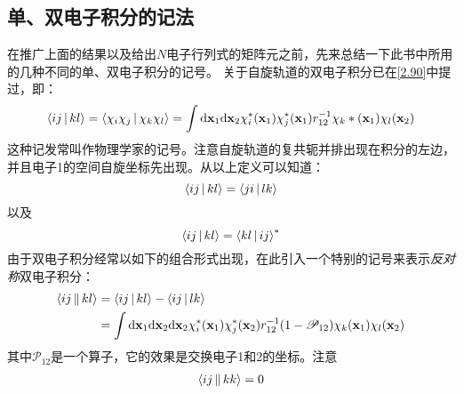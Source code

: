 
\subsection{单、双电子积分的记法}
\label{sec2.3.2}
在推广上面的结果以及给出$N$电子行列式的矩阵元之前，先来总结一下此书中所用的几种不同的单、双电子积分的记号。
关于自旋轨道的双电子积分已在\ref{2.90}中提过，即：
\begin{equation}
\braket{ij|kl}=\braket{\chi_i\chi_j|\chi_k\chi_l}=\int\dd\mathbf{x}_1\dd\mathbf{x}_2\chi_i^*(\mathbf{x}_1)\chi_j^*(\mathbf{x}_1)r_{12}^{-1}\chi_k*(\mathbf{x}_1)\chi_l(\mathbf{x}_2)
\end{equation}
这种记发常叫作物理学家的记号。注意自旋轨道的复共轭并排出现在积分的左边，并且电子1的空间自旋坐标先出现。从以上定义可以知道：
\begin{equation}
\Braket{ij|kl}=\Braket{ji|lk}
\end{equation}
以及
\begin{equation}
\Braket{ij|kl}=\Braket{kl|ij}^*
\end{equation}
由于双电子积分经常以如下的组合形式出现，在此引入一个特别的记号来表示\emph{反对称}双电子积分：
\begin{align}
\braket{ij||kl}&=\braket{ij|kl} - \braket{ij|lk}\notag\\
&=\int\dd\bo{x}_1\dd\bo{x}_2\ddx_2\chi_i^*(\bo{x}_1)\chi_j^*(\bo{x}_2)r_{12}^{-1}(1-\mathscr{P}_{12})\chi_k(\bo{x}_1)\chi_l(\bo{x}_2)
\end{align}
其中$\mathscr{P}_{12}$是一个算子，它的效果是交换电子1和2的坐标。注意
\begin{align}
\Braket{ij||kk}=0
\end{align}

